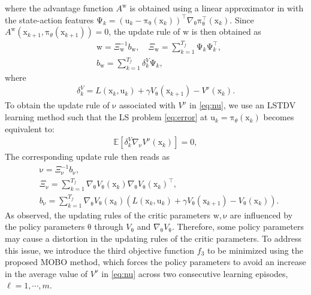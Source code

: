 \documentclass[10pt,twocolumn,twoside]{IEEEtran}
\newcommand{\vect}[1]{\ensuremath{\boldsymbol{\mathrm{#1}}}}
\begin{document}
where the advantage function $A^{\vect w}$ is obtained using a linear approximator in with the state-action features $\vect\Psi_k={{\left( {\vect u_k - {\vect\pi_{\vect\theta}\left(\vect x_k\right) }} \right)}^{\top}}\nabla_{\vect\theta}\vect\pi_{\vect\theta}^\top\left(\vect x_k\right)$. Since $A^{\vect w}\left({\vect x_{k+1},\vect\pi_{\theta}(\vect x_{k+1})} \right)=0$, the update rule of $\vect w$ is then obtained as
\begin{subequations}
\label{eq:lstdq_update}
\begin{align}
    &\vect w=\Xi_{\vect w}^{-1}b_{\vect w},\quad \Xi_{\vect w}= \sum_{k=1}^{T_f}\vect \Psi_k\vect \Psi_k^{\top},\\
    &b_{\vect w}=\sum_{k=1}^{T_f}\delta^V_k\vect\Psi_k,
\end{align}
\end{subequations}
where
\begin{align}
    \delta^V_k=L\left(\vect x_k,\vect u_k\right)+\gamma V_{\vect\theta}\left({\vect x_{k+1}}\right)-V^{\vect\nu}\left({\vect x_k}\right).
\end{align}
To obtain the update rule of $\vect\nu$ associated with $V^{\vect\nu}$ in \eqref{eq:nu}, we use an LSTDV learning method such that the LS problem \eqref{eq:error} at $\vect u_k=\vect\pi_{\theta}(\vect x_k)$ becomes equivalent to:
\begin{align}\label{eq:LSTDV}
    \mathbb{E}\left[\delta^V_k\nabla_{\vect\nu} V^{\vect\nu}\left({\vect x_k} \right)\right]=0,
\end{align}
The corresponding update rule then reads as
\begin{subequations}
\label{eq:lstdv_update}
\begin{align}
    &\vect \nu=\Xi_{\vect \nu}^{-1}b_{\vect \nu},\\
    &\Xi_{\vect \nu}=\sum_{k=1}^{T_f}\nabla_{\vect\theta}V_{{\vect\theta} }(\vect x_k)\nabla_{\vect\theta}V_{{\vect\theta} }(\vect x_k)^\top,\\
    &b_{\vect \nu}=\sum_{k=1}^{T_f}{\nabla_{\vect\theta}V_{{\vect\theta} }(\vect x_k)\left(L(\vect x_k,\vect u_k)+\gamma V_{{\vect\theta} }(\vect x_{k+1})-V_{{\vect\theta} }(\vect x_k)\right)}.
\end{align}
\end{subequations}
As observed, the updating rules of the critic parameters $\vect w,\vect\nu$ are influenced by the policy parameters $\vect\theta$ through $V_{\vect\theta}$ and $\nabla_{\vect\theta} V_{\vect\theta}$. Therefore, some policy parameters may cause a distortion in the updating rules of the critic parameters. To address this issue, we introduce the third objective function $f_3$ to be minimized using the proposed MOBO method, which forces the policy parameters to avoid an increase in the average value of $V^{\vect\nu}$ in \eqref{eq:nu} across two consecutive learning episodes, $\ell=1,\cdots,m$. 
\end{document}
